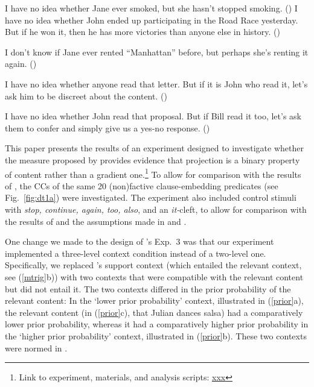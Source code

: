 \documentclass[11pt,fleqn]{article}
\def\infelic{{\leavevmode\llap{\#}}}
\newcommand{\6}{\mbox{$[\hspace*{-.6mm}[$}}
\newcommand{\9}{\mbox{$]\hspace*{-.6mm}]$}}
\newcommand{\citepos}[1]{\citeauthor{#1}'s \citeyear{#1}}
\begin{document}
\begin{exe}
\ex\label{eic2}
\begin{xlist}
\ex I have no idea whether Jane ever smoked, but she hasn't stopped smoking. \hfill (\citealt[443]{simons01})
\ex I have no idea whether John ended up participating in the
Road Race yesterday. But if he won it, then he has more victories than anyone else in history. \hfill (\citealt[39]{abusch10})
\end{xlist}
\ex\label{eic3}
\begin{xlist}
\ex\infelic I don't know if Jane ever rented ``Manhattan'' before, but perhaps she's renting it again. \hfill (\citealt[443]{simons01})

\ex \infelic I have no idea whether anyone read that letter. But if it is John
who read it, let's ask him to be discreet about the content. \hfill (\citealt[40]{abusch10})

\ex \infelic I have no idea whether John read that proposal. But if Bill read it too, let's ask them to confer and simply give us a yes-no response. \hfill (\citealt[40]{abusch10})
\end{xlist}
\end{exe}

This paper presents the results of an experiment designed to investigate whether the measure proposed by \citealt{mandelkern-etal2020} provides evidence that projection is a binary property of content rather than a gradient one.\footnote{Link to experiment, materials, and analysis scripts: \url{xxx}}  To allow for comparison with the results of \citealt{degen-tonhauser-language}, the CCs of the same 20 (non)factive clause-embedding predicates (see Fig.~\ref{fig:dt1a}) were investigated. The experiment also included control stimuli with {\em stop, continue, again, too, also}, and an {\em it-}cleft, to allow for comparison with the results of \citealt{mandelkern-etal2020} and the assumptions made in \citealt{simons01} and \citealt{abusch10}. 

One change we made to the design of \citepos{mandelkern-etal2020} Exp.~3 was that our experiment implemented a three-level context condition instead of a two-level one. Specifically, we replaced \citepos{mandelkern-etal2020} support context (which entailed the relevant context, see (\ref{mtrig}b)) with two contexts that were compatible with the relevant content but did not entail it. The two contexts differed in the prior probability of the relevant content: In the `lower prior probability' context, illustrated in (\ref{prior}a), the  relevant content (in (\ref{prior}c), that Julian dances salsa) had a comparatively lower prior probability, whereas it had a comparatively higher prior probability in the `higher prior probability' context, illustrated in (\ref{prior}b). These two contexts were normed in \citealt{degen-tonhauser-openmind}. 
\end{document}
